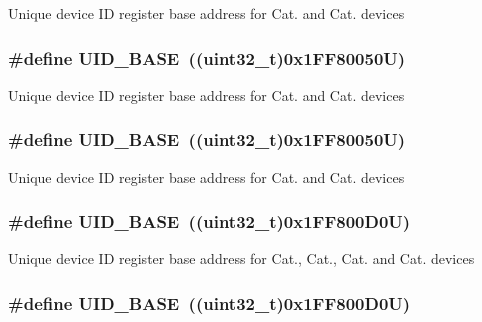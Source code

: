 Unique device I\-D register base address for Cat. and Cat. devices \hypertarget{group___peripheral__memory__map_ga664eda42b83c919b153b07b23348be67}{
\subsubsection[{U\-I\-D\-\_\-\-B\-A\-S\-E}]{\setlength{\rightskip}{0pt plus 5cm}\#define U\-I\-D\-\_\-\-B\-A\-S\-E~((uint32\-\_\-t)0x1\-F\-F80050\-U)}}\label{group___peripheral__memory__map_ga664eda42b83c919b153b07b23348be67}
Unique device I\-D register base address for Cat. and Cat. devices \hypertarget{group___peripheral__memory__map_ga664eda42b83c919b153b07b23348be67}{
\subsubsection[{U\-I\-D\-\_\-\-B\-A\-S\-E}]{\setlength{\rightskip}{0pt plus 5cm}\#define U\-I\-D\-\_\-\-B\-A\-S\-E~((uint32\-\_\-t)0x1\-F\-F80050\-U)}}\label{group___peripheral__memory__map_ga664eda42b83c919b153b07b23348be67}
Unique device I\-D register base address for Cat. and Cat. devices \hypertarget{group___peripheral__memory__map_ga664eda42b83c919b153b07b23348be67}{
\subsubsection[{U\-I\-D\-\_\-\-B\-A\-S\-E}]{\setlength{\rightskip}{0pt plus 5cm}\#define U\-I\-D\-\_\-\-B\-A\-S\-E~((uint32\-\_\-t)0x1\-F\-F800\-D0\-U)}}\label{group___peripheral__memory__map_ga664eda42b83c919b153b07b23348be67}
Unique device I\-D register base address for Cat., Cat., Cat. and Cat. devices \hypertarget{group___peripheral__memory__map_ga664eda42b83c919b153b07b23348be67}{
\subsubsection[{U\-I\-D\-\_\-\-B\-A\-S\-E}]{\setlength{\rightskip}{0pt plus 5cm}\#define U\-I\-D\-\_\-\-B\-A\-S\-E~((uint32\-\_\-t)0x1\-F\-F800\-D0\-U)}}\label{group___peripheral__memory__map_ga664eda42b83c919b153b07b23348be67}
